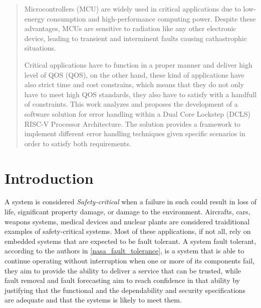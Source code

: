 \documentclass[10pt, a4paper]{report}
\begin{document}
\newpage

\begin{abstract}
    \thispagestyle{fancy}
    Microcontrollers (\acrshort{MCU}) are widely used in critical applications 
    due to low-energy consumption and high-performance computing power. Despite 
    these advantages, \acrshort{MCU}s are sensitive to radiation like any other
    electronic device, leading to transient and interminent faults causing
    cathastrophic situations.

    Critical applications have to function in a proper manner and deliver high
    level of \acrlong{QOS} (\acrshort{QOS}), on the other hand, these kind of
    applications have also strict time and cost constrains, which means that
    they do not only have to meet high \acrshort{QOS} standards, they also have
    to satisfy with a handfull of constraints. This work analyzes and proposes 
    the development of a software solution for error handling within a Dual Core 
    Lockstep (\acrshort{DCLS}) RISC-V Processor Architecture. The solution 
    provides a framework to implement different error handling techniques given 
    specific scenarios in order to satisfy both requirements.
\end{abstract}

\newpage
\begin{tableofcontents}
    \thispagestyle{fancy}
\end{tableofcontents}

\newpage

\chapter{Introduction}

\thispagestyle{fancy}
A system is considered \emph{Safety-critical} when a failure in such could
result in loss of life, significant property damage, or damage to the
environment. Aircrafts, cars, weapons systems, medical devices and nuclear plants 
are considered traiditional examples of safety-critical systems. Most of these 
applications, if not all, rely on embedded systems that are expected to be fault 
tolerant. A system fault tolerant, according to the authors in 
\ref{nasa_fault_tolerance}, is a system that is able to continue operating 
without interruption when one or more of its components fail, they aim 
to provide the ability to deliver a service that can be trusted, while fault 
removal and fault forecasting aim to reach confidence in that ability by 
justifying that the functional and the dependability and security specifications 
are adequate and that the systems is likely to meet them.
\end{document}
